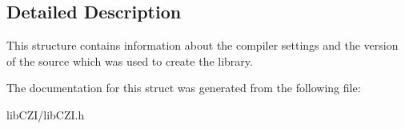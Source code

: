 \subsection{Detailed Description}
This structure contains information about the compiler settings and the version of the source which was used to create the library. 

The documentation for this struct was generated from the following file\+:\begin{DoxyCompactItemize}
\item 
lib\+C\+Z\+I/lib\+C\+Z\+I.\+h\end{DoxyCompactItemize}

